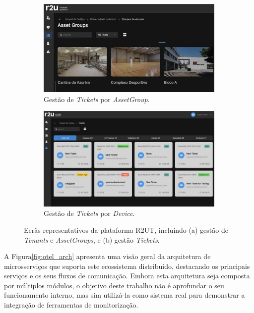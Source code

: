\begin{figure}[H]
    \centering
        \begin{subfigure}[t]{0.48\textwidth}
        \includegraphics[width=\textwidth]{images/r2ut/dtx_1.jpg}
        \caption{Gestão de \textit{Tickets} por \textit{AssetGroup}.}
        \label{fig:r2utBoard}
    \end{subfigure}
    \hfill
    \begin{subfigure}[t]{0.48\textwidth}
        \includegraphics[width=\textwidth]{images/r2ut/dtx_2.jpg}
        \caption{Gestão de \textit{Tickets} por \textit{Device}.}
        \label{fig:r2utBoard_diagram}
    \end{subfigure}
    \caption{Ecrãs representativos da plataforma R2UT, incluindo (a) gestão de \textit{Tenants} e \textit{AssetGroups}, e (b) gestão \textit{Tickets}.}
    \label{fig:r2ut-ui}
\end{figure}

A Figura\ref{fig:otel_arch} apresenta uma visão geral da arquitetura de microsserviços que suporta este ecossistema distribuído, destacando os principais serviços e os seus fluxos de comunicação. Embora esta arquitetura seja composta por múltiplos módulos, o objetivo deste trabalho não é aprofundar o seu funcionamento interno, mas sim utilizá-la como sistema real para demonstrar a integração de ferramentas de monitorização. 

